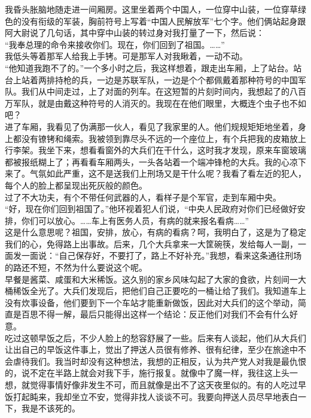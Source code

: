 我昏头胀脑地随走进一间厢房。这里坐着两个中国人，一位穿中山装，一位穿草绿色的没有衔级的军装，胸前符号上写着“中国人民解放军”七个字。他们俩站起身跟阿大尉说了几句话，其中穿中山装的转过身对我打量了一下，然后说：\\

“我奉总理的命令来接收你们。现在，你们回到了祖国。……”\\

我低头等着那军人给我上手铐。可是那军人对我瞅着，一动不动。\\

“他知道我跑不了的。”一个多小时之后，我这样想着，跟走出车厢，上了站台。站台上站着两排持枪的兵，一边是苏联军队，一边是个个都佩戴着那种符号的中国军队。我们从中间走过，上了对面的列车。在这短暂的片刻时间内，我想起了的八百万军队，就是由戴这种符号的人消灭的。我现在在他们眼里，大概连个虫子也不如吧？\\

进了车厢，我看见了伪满那一伙人，看见了我家里的人。他们规规矩矩地坐着，身上都没有镣铐和绳索。我被领到靠尽头不远的一个座位上，有个兵把我的皮箱放上行李架。我坐下来，想看看窗外的大兵们在干什么，这时我才发现，原来车窗玻璃都被报纸糊上了；再看看车厢两头，一头各站着一个端冲锋枪的大兵。我的心凉下来了。气氛如此严重，这不是送我们上刑场又是干什么呢？我看了看左近的犯人，每个人的脸上都呈现出死灰般的颜色。\\

过了不大功夫，有个不带任何武器的人，看样子是个军官，走到车厢中央。\\

“好，现在你们回到祖国了。”他环视着犯人们说，“中央人民政府对你们已经做好安排，你们可以放心。……车上有医务人员，有病的就来报名看病……”\\

这是什么意思呢？祖国，安排，放心，有病的看病？呵，我明白了，这是为了稳定我们的心，免得路上出事故。后来，几个大兵拿来一大筐碗筷，发给每人一副，一面发一面说：“自己保存好，不要打了，路上不好补充。”我想，看来这条通往刑场的路还不短，不然为什么要说这个呢。\\

早餐是酱菜、咸蛋和大米稀饭。这久别的家乡风味勾起了大家的食欲，片刻间一大桶稀饭全光了。大兵们发现后，把他们自己正要吃的一桶让给了我们。我知道车上没有炊事设备，他们要到下一个车站才能重新做饭，因此对大兵们的这个举动，简直是百思不得一解，最后只能得出这样一个结论：反正他们对我们不会有什么好意。\\

吃过这顿早饭之后，不少人脸上的愁容舒展了一些。后来有人谈起，他们从大兵们让出自己的早饭这件事上，觉出了押送人员很有修养、很有纪律，至少在旅途中不会虐待我们。我当时却没有这种想法，我想的正相反，认为共产党人对我是最仇恨的，说不定在半路上就会对我下手，施行报复。就像中了魔一样，我往这上头一想，就觉得事情好像非发生不可，而且就像是出不了这天夜里似的。有的人吃过早饭打起盹来，我却坐立不安，觉得非找人谈谈不可。我要向押送人员尽早地表白一下，我是不该死的。\\

